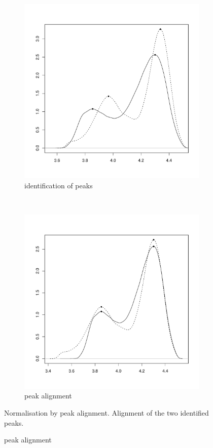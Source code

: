 \begin{figure}[h]
\begin{subfigure}[b]{.5\textwidth}
\centering
\includegraphics[scale=.4]{figures/normalisation-peaks-a.pdf} 
\caption{identification of peaks}
\end{subfigure}
~
\begin{subfigure}[b]{.5\textwidth}
\centering
\includegraphics[scale=.4]{figures/normalisation-peaks-b.pdf} 
\caption{peak alignment}
\end{subfigure}
{Normalisation by peak alignment.}
{
Alignment of the two identified peaks.
}
\end{figure}


